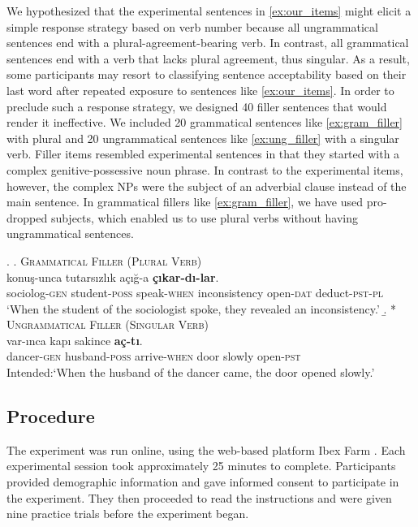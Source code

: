 \documentclass[apacite,linguex]{glossa}\usepackage[]{graphicx}\usepackage[]{color}
\begin{document}
We hypothesized that the experimental sentences in \ref{ex:our_items} might elicit a simple response strategy based on verb number because all ungrammatical sentences end with a plural-agreement-bearing verb. In contrast, all grammatical sentences end with a verb that lacks plural agreement, thus singular. As a result, some participants may resort to classifying sentence acceptability based on their last word after repeated exposure to sentences like \ref{ex:our_items}. In order to preclude such a response strategy, we designed 40 filler sentences that would render it ineffective. We included 20 grammatical sentences like \ref{ex:gram_filler} with plural and 20 ungrammatical sentences like \ref{ex:ung_filler} with a singular verb. Filler items resembled experimental sentences in that they started with a complex genitive-possessive noun phrase. In contrast to the experimental items, however, the complex NPs were the subject of an adverbial clause instead of the main sentence. In grammatical fillers like \ref{ex:gram_filler}, we have used pro-dropped subjects, which enabled us to use plural verbs without having ungrammatical sentences. 


\ex. \label{ex:fillers}
  \a. \textsc{Grammatical Filler (Plural Verb)} \label{ex:gram_filler}\\
   konu\c{s}-unca tutars{\i}zl{\i}k a\c{c}{\i}\u{g}-a \textbf{\c{c}{\i}kar-d{\i}-lar}.\\ 
  sociolog-\textsc{gen}  student-\textsc{poss} speak-\textsc{when} inconsistency  open-\textsc{dat} deduct-\textsc{pst}-\textsc{pl}\\
  \glt `When the student of the sociologist spoke, they revealed an inconsistency.'
  \b. * \textsc{Ungrammatical Filler (Singular Verb)} \label{ex:ung_filler}\\
   var-{\i}nca kap{\i} sakince \textbf{a\c{c}-t{\i}}. \\
  dancer-\textsc{gen}  husband-\textsc{poss} arrive-\textsc{when} door slowly  open-\textsc{pst}\\
  \glt Intended:`When the husband of the dancer came, the door opened slowly.'


\subsection{Procedure}

The experiment was run online, using the web-based platform Ibex Farm \citep{Drummond2013}. Each experimental session took approximately 25 minutes to complete. Participants provided demographic information and gave informed consent to participate in the experiment. They then proceeded to read the instructions and were given nine practice trials before the experiment began.
\end{document}
